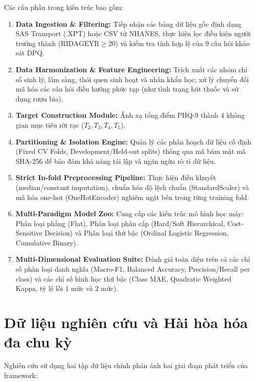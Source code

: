 Các cấu phần trong kiến trúc bao gồm:
\begin{enumerate}
    \item \textbf{Data Ingestion \& Filtering:} Tiếp nhận các bảng dữ liệu gốc định dạng SAS Transport (.XPT) hoặc CSV từ NHANES, thực hiện lọc điều kiện người trưởng thành ($\text{RIDAGEYR} \ge 20$) và kiểm tra tính hợp lệ của 9 câu hỏi khảo sát DPQ.
    \item \textbf{Data Harmonization \& Feature Engineering:} Trích xuất các nhóm chỉ số sinh lý, lâm sàng, thói quen sinh hoạt và nhân khẩu học; xử lý chuyển đổi mã hóa các câu hỏi điều hướng phức tạp (như tình trạng hút thuốc và sử dụng rượu bia).
    \item \textbf{Target Construction Module:} Ánh xạ tổng điểm PHQ-9 thành 4 không gian mục tiêu rời rạc ($T_2, T_3, T_4, T_5$).
    \item \textbf{Partitioning \& Isolation Engine:} Quản lý các phân hoạch dữ liệu cố định (Fixed CV Folds, Development/Held-out splits) thông qua mã băm mật mã SHA-256 để bảo đảm khả năng tái lập và ngăn ngừa rò rỉ dữ liệu.
    \item \textbf{Strict In-fold Preprocessing Pipeline:} Thực hiện điền khuyết (median/constant imputation), chuẩn hóa độ lệch chuẩn (StandardScaler) và mã hóa one-hot (OneHotEncoder) nghiêm ngặt bên trong từng training fold.
    \item \textbf{Multi-Paradigm Model Zoo:} Cung cấp các kiến trúc mô hình học máy: Phân loại phẳng (Flat), Phân loại phân cấp (Hard/Soft Hierarchical, Cost-Sensitive Decision) và Phân loại thứ bậc (Ordinal Logistic Regression, Cumulative Binary).
    \item \textbf{Multi-Dimensional Evaluation Suite:} Đánh giá toàn diện trên cả các chỉ số phân loại danh nghĩa (Macro-F1, Balanced Accuracy, Precision/Recall per class) và các chỉ số hình học thứ bậc (Class MAE, Quadratic Weighted Kappa, tỷ lệ lỗi 1 mức và 2 mức).
\end{enumerate}

\section{Dữ liệu nghiên cứu và Hài hòa hóa đa chu kỳ}
\label{sec:du-lieu-nghien-cuu}

Nghiên cứu sử dụng hai tập dữ liệu chính phản ánh hai giai đoạn phát triển của framework:

